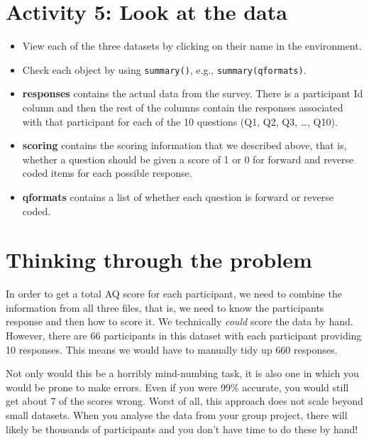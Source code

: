 \documentclass[
  oneside]{book}
\begin{document}
\hypertarget{activity-5-look-at-the-data}{%
\section{Activity 5: Look at the data}\label{activity-5-look-at-the-data}}

\begin{itemize}
\item
  View each of the three datasets by clicking on their name in the environment.
\item
  Check each object by using \texttt{summary()}, e.g., \texttt{summary(qformats)}.
\item
  \textbf{responses} contains the actual data from the survey. There is a participant Id column and then the rest of the columns contain the responses associated with that participant for each of the 10 questions (Q1, Q2, Q3, \ldots, Q10).\\
\item
  \textbf{scoring} contains the scoring information that we described above, that is, whether a question should be given a score of 1 or 0 for forward and reverse coded items for each possible response.\\
\item
  \textbf{qformats} contains a list of whether each question is forward or reverse coded.
\end{itemize}

\hypertarget{thinking-through-the-problem}{%
\section{Thinking through the problem}\label{thinking-through-the-problem}}

In order to get a total AQ score for each participant, we need to combine the information from all three files, that is, we need to know the participants response and then how to score it. We technically \emph{could} score the data by hand. However, there are 66 participants in this dataset with each participant providing 10 responses. This means we would have to manually tidy up 660 responses.

Not only would this be a horribly mind-numbing task, it is also one in which you would be prone to make errors. Even if you were 99\% accurate, you would still get about 7 of the scores wrong. Worst of all, this approach does not scale beyond small datasets. When you analyse the data from your group project, there will likely be thousands of participants and you don't have time to do these by hand!
\end{document}
